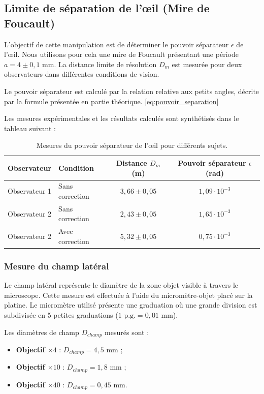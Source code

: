 \subsection{Limite de séparation de l'œil (Mire de Foucault)}

L'objectif de cette manipulation est de déterminer le pouvoir séparateur $\epsilon$ de l'œil.
Nous utilisons pour cela une mire de Foucault
présentant une période $a = 4 \pm 0,1 \text{ mm}$.
La distance limite de résolution $D_m$ est mesurée pour deux observateurs
dans différentes conditions de vision.

Le pouvoir séparateur est calculé par la relation relative aux petits angles,
décrite par la formule présentée en partie théorique. \eqref{eq:pouvoir_separation}

Les mesures expérimentales et les résultats calculés
sont synthétisés dans le tableau suivant :

\begin{table}[h!]
    \centering
    \begin{tabular}{|l|l|c|c|}
        \hline
        \textbf{Observateur} & \textbf{Condition} & \textbf{Distance $D_m$ (m)} & \textbf{Pouvoir séparateur $\epsilon$ (rad)} \\
        \hline
        Observateur 1 & Sans correction & $3,66 \pm 0,05$ & $1,09 \cdot 10^{-3}$ \\
        \hline
        Observateur 2 & Sans correction & $2,43 \pm 0,05$ & $1,65 \cdot 10^{-3}$ \\
        \hline
        Observateur 2 & Avec correction & $5,32 \pm 0,05$ & $0,75 \cdot 10^{-3}$ \\
        \hline
    \end{tabular}
    \caption{Mesures du pouvoir séparateur de l'œil pour différents sujets.}
    \label{tab:mire_foucault}
\end{table}

\subsubsection{Mesure du champ latéral}

Le champ latéral représente le diamètre de la zone objet visible à travers le microscope.
Cette mesure est effectuée à l'aide du micromètre-objet placé sur la platine.
Le micromètre utilisé présente une graduation où une grande division 
est subdivisée en 5 petites graduations ($1 \text{ p.g.} = 0,01 \text{ mm}$).

Les diamètres de champ $D_{champ}$ mesurés sont :
\begin{itemize}
    \item \textbf{Objectif $\times 4$} : $D_{champ} = 4,5 \text{ mm}$ ;
    \item \textbf{Objectif $\times 10$} : $D_{champ} = 1,8 \text{ mm}$ ;
    \item \textbf{Objectif $\times 40$} : $D_{champ} = 0,45 \text{ mm}$.
\end{itemize}

